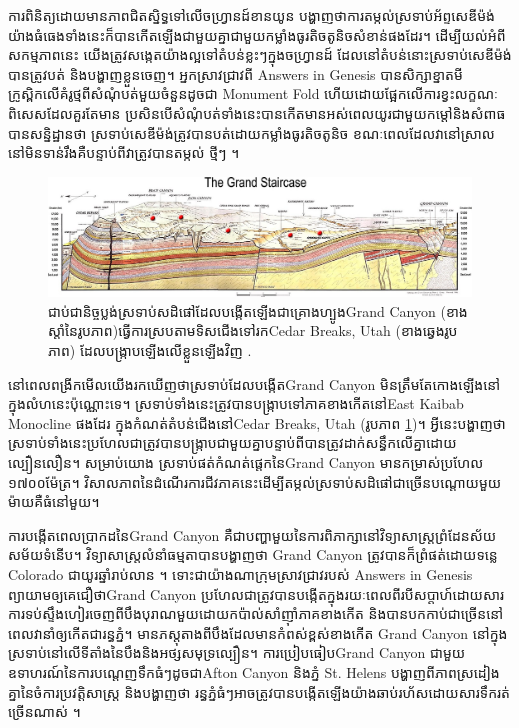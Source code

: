 \documentclass[10pt,twocolumn,letterpaper]{article}
\begin{document}
ការពិនិត្យដោយមានភាពជិតស្និទ្ធទៅលើចហ្រ្វានដ៍ខានយូន បង្ហាញថាការតម្កល់ស្រទាប់អ័ព្ទសេឌីម៉ង់យ៉ាងធំធេងទាំងនេះ​ក៏បានកើតឡើងជាមួយគ្នាជាមួយកម្លាំងធូរតិចតូនិចសំខាន់ផងដែរ។ ដើម្បីយល់អំពីសកម្មភាពនេះ យើងត្រូវសង្កេតយ៉ាងល្អទៅតំបន់ខ្លះៗក្នុងចហ្រ្វានដ៍ ដែលនៅតំបន់នោះស្រទាប់សេឌីម៉ង់បានត្រូវបត់ និងបង្ហាញខ្លួនចេញ។ អ្នកស្រាវជ្រាវពី Answers in Genesis \cite{42} បានសិក្សាខ្នាតមីក្រូស្ពិកលើគំរូថ្មពីសំណុំបត់មួយចំនួនដូចជា Monument Fold ហើយដោយផ្អែកលើការខ្វះលក្ខណៈពិសេសដែលគួរតែមាន ប្រសិនបើសំណុំបត់ទាំងនេះបានកើតមានអស់ពេលយូរជាមួយកម្តៅនិងសំពាធ បានសន្និដ្ឋានថា ស្រទាប់សេឌីម៉ង់ត្រូវបានបត់ដោយកម្លាំងធូរតិចតូនិច ខណៈពេលដែលវានៅស្រាល នៅមិនទាន់រឹងគឺបន្ទាប់ពីវាត្រូវបានតម្កល់ ថ្មីៗ \cite{43}។

\begin{figure}
\begin{center}
\includegraphics[width=1\textwidth]{Grand_Staircase-big.jpg}
\end{center}
   \caption{ជាប់ជានិច្ចប្លង់ស្រទាប់សដិផៅដែលបង្កើតឡើងជាគ្រោងហ្បូងGrand Canyon (ខាងស្តាំនៃរូបភាព)ធ្វើការស្របតាមទិសជើងទៅរកCedar Breaks, Utah (ខាងឆ្វេងរូបភាព) ដែលបង្រ្កាបឡើងលើខ្លួនឡើងវិញ \cite{50}.}
\label{fig:4}
\end{figure}

នៅពេលពង្រីកមើលយើងរកឃើញថាស្រទាប់ដែលបង្កើតGrand Canyon មិនត្រឹមតែកោងឡើងនៅក្នុងលំហនេះប៉ុណ្ណោះទេ។ ស្រទាប់ទាំងនេះត្រូវបានបង្រ្កាបទៅភាគខាងកើតនៅEast Kaibab Monocline \cite{46} ផងដែរ ក្នុងកំណត់តំបន់ជើងនៅCedar Breaks, Utah (រូបភាព \ref{fig:4})។ អ្វីនេះបង្ហាញថាស្រទាប់ទាំងនេះប្រហែលជាត្រូវបានបង្រ្កាបជាមួយគ្នាបន្ទាប់ពីបានត្រូវដាក់សន្ធឹកលើគ្នាដោយល្បឿនលឿន។ សម្រាប់យោង ស្រទាប់ផត់កំណត់ផ្តេកនៃGrand Canyon មានកម្រាស់ប្រហែល ១៧០០ម៉ែត្រ។ វិសាលភាពនៃដំណើរការជីវភាគនេះដើម្បីតម្កល់ស្រទាប់សដិផៅជាច្រើនបណ្តោយមួយម៉ាយគឺធំនៅមួយ។

ការបង្កើតពេលប្រាកដនៃGrand Canyon គឺជាបញ្ហាមួយនៃការពិភាក្សានៅវិទ្យាសាស្ត្រព្រំដែនស័យសម័យទំនើប។ វិទ្យាសាស្ត្រលំនាំធម្មតាបានបង្ហាញថា Grand Canyon ត្រូវបានក៏ព្រំផត់ដោយទន្លេ Colorado ជាយូរឆ្នាំរាប់លាន \cite{47}។ ទោះជាយ៉ាងណាក្រុមស្រាវជ្រាវរបស់ Answers in Genesis ព្យាយាមឲ្យគេជឿថាGrand Canyon ប្រហែលជាត្រូវបានបង្កើតក្នុងរយៈពេលពីរបីសប្តាហ៍ដោយសារការទប់ស្ទឹងហៀរចេញពីបឹងបុរាណមួយដោយកប៉ាល់សាំញ៉ាំភាគខាងកើត និងបានបកកាប់ជាច្រើននៅពេលវានាំឲ្យកើតជារន្ធភ្នំ។ មានភស្តុតាងពីបឹងដែលមានកំពស់ខ្ពស់ខាងកើត Grand Canyon នៅក្នុងស្រទាប់នៅលើទីតាំងនៃបឹងនិងអថ្សសមុទ្រល្បឿន។ ការប្រៀបធៀបGrand Canyon ជាមួយឧទាហរណ៍នៃការបណ្តេញទឹកធំៗដូចជាAfton Canyon និងភ្នំ St. Helens បង្ហាញពីភាពស្រដៀងគ្នានៃចំការប្រវត្តិសាស្ត្រ និងបង្ហាញថា រន្ធភ្នំធំៗអាចត្រូវបានបង្កើតឡើងយ៉ាងឆាប់រហ័សដោយសារទឹករត់ច្រើនណាស់ \cite{48}។
\end{document}
